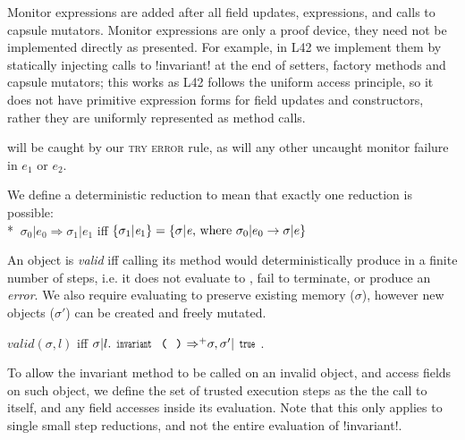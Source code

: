 
\noindent Monitor expressions are added after all field updates, \Q@new@ expressions, and calls to capsule mutators.
Monitor expressions are only a proof device, they need not be implemented directly as presented.
For example, in L42 we implement them by statically injecting calls to \Q!invariant! at the end of setters, factory methods and capsule mutators; this works as L42 follows the uniform access principle, so it does not have primitive expression forms for field updates and constructors, rather they are uniformly represented as method calls.

  will be caught by our \textsc{try error} rule, as will any other uncaught monitor failure in $e_1$ or $e_2$.

We define a deterministic reduction to mean that exactly one reduction is possible:\\*
\indent$\ \sigma_0|e_0\Rightarrow \sigma_1|e_1$ iff $\{\sigma_1|{\mathit{e}}_1\}=\{\sigma|{\mathit{e}} \text{, where } \sigma_0|e_0\rightarrow \sigma|e\}$

\noindent An object is \emph{valid} iff calling its \Q@invariant@ method would
deterministically produce \Q@true@ in a finite number of steps, i.e. it does not evaluate to \Q@false@, fail to terminate, or produce an \emph{error}.
We also require evaluating \Q@invariant@ to preserve existing memory ($\sigma$), however new objects ($\sigma'$) can be created and freely mutated.

\indent$\mathit{valid}(\sigma,l)$ iff $\sigma | l.\invariant {\Rightarrow^+} \sigma,\sigma' | \Kw{true}$.%

\noindent 
To allow the invariant method to be called on an invalid object, and access fields on such object, we define the set of trusted execution steps as the the call to \Q@invariant@ itself, and any field accesses inside its evaluation. Note that this only applies to single small step reductions, and not the entire evaluation of \Q!invariant!.

